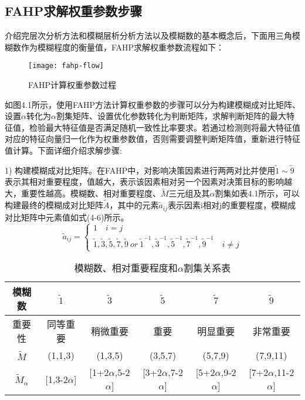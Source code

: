 \subsection{FAHP求解权重参数步骤}
介绍完层次分析方法和模糊层析分析方法以及模糊数的基本概念后，下面用三角模糊数作为模糊程度的衡量值，FAHP求解权重参数流程如下：
\begin{figure}[H] %
	\centering
	\texttt{[image: fahp-flow]}
	\caption{FAHP计算权重参数过程}
\end{figure}
如图4.1所示，使用FAHP方法计算权重参数的步骤可以分为构建模糊成对比矩阵、设置$\alpha$转化为$\alpha$割集矩阵、设置优化参数转化为判断矩阵，求解判断矩阵的最大特征值，检验最大特征值是否满足随机一致性比率要求。若通过检测则将最大特征值对应的特征向量归一化作为权重参数值，否则需要调整判断矩阵值，重新进行特征值计算。下面详细介绍求解步骤:

1) 构建模糊成对比矩阵。在FAHP中，对影响决策因素进行两两对比并使用$\widetilde{1}\sim \widetilde{9}$表示其相对重要程度，值越大，表示该因素相对另一个因素对决策目标的影响越大，重要性越高。模糊数、相对重要程度、$\widetilde{M}$三元组及其$\alpha$割集如表4.1所示，可以构建最终的模糊成对比矩阵$\widetilde{A} $，其中的元素$\widetilde{a}_{ij} $表示因素i相对j的重要程度，模糊成对比矩阵中元素值如式(4-6)所示。
\begin{equation}
\widetilde{a}_{ij} = \left\{\begin{array}{l}
1 \quad i=j \\ [0.2cm]
\widetilde{1},\widetilde{3},\widetilde{5},\widetilde{7},\widetilde{9}\ or\ \widetilde{1}^{-1},\widetilde{3}^{-1},\widetilde{5}^{-1},\widetilde{7}^{-1},\widetilde{9}^{-1} \quad i\not=j  
\end{array}\right.
\end{equation}
\begin{table}[htbp]
	\centering\dawu[1.3]
	\caption{模糊数、相对重要程度和$\alpha$割集关系表}
	\begin{tabular}{|c|c|c|c|c|c|} \hline
		模糊数 & $\widetilde{1}$ & $\widetilde{3}$ & $\widetilde{5}$  & $\widetilde{7}$ & $\widetilde{9}$ \\ \hline
		重要性 & 同等重要 & 稍微重要 & 重要 & 明显重要 & 非常重要 \\ \hline 
		$\widetilde{M}$ & (1,1,3) & (1,3,5) & (3,5,7) & (5,7,9) & (7,9,11) \\ \hline 
		$\widetilde{M}_{\alpha}$ & [1,3-2$\alpha$] & [1+2$\alpha$,5-2$\alpha$] & [3+2$\alpha$,7-2$\alpha$] & [5+2$\alpha$,9-2$\alpha$] & [7+2$\alpha$,11-2$\alpha$]\\ \hline 
	\end{tabular}
\end{table}

